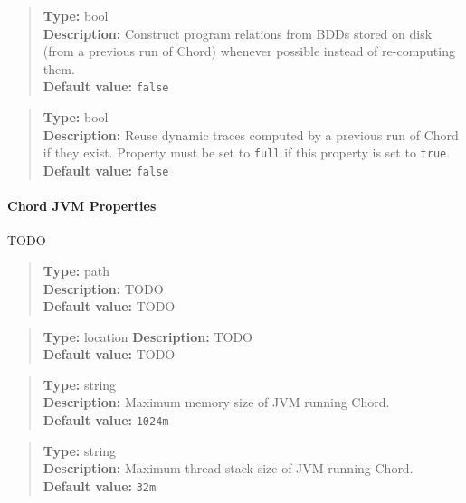 \noindent {}
\begin{quote}
{\bf Type:} bool  \\
{\bf Description:} Construct program relations from BDDs stored on disk (from a previous run of Chord) whenever possible instead of re-computing them. \\
{\bf Default value:} {\tt false}
\end{quote}

\noindent {}
\begin{quote}
{\bf Type:} bool \\
{\bf Description:} Reuse dynamic traces computed by a previous run of Chord if they exist.  Property  must be set to {\tt full} if this property is set to {\tt true}. \\
{\bf Default value:} {\tt false}
\end{quote}

\paragraph{Chord JVM Properties}

TODO

\noindent {}
\begin{quote}
{\bf Type:} path \\
{\bf Description:} TODO \\
{\bf Default value:} TODO
\end{quote}

\noindent {}
\begin{quote}
{\bf Type:} location
{\bf Description:} TODO \\
{\bf Default value:} TODO
\end{quote}

\noindent {}
\begin{quote}
{\bf Type:} string \\
{\bf Description:} Maximum memory size of JVM running Chord. \\
{\bf Default value:} {\tt 1024m}
\end{quote}

\noindent {}
\begin{quote}
{\bf Type:} string \\
{\bf Description:} Maximum thread stack size of JVM running Chord. \\
{\bf Default value:} {\tt 32m}
\end{quote}

